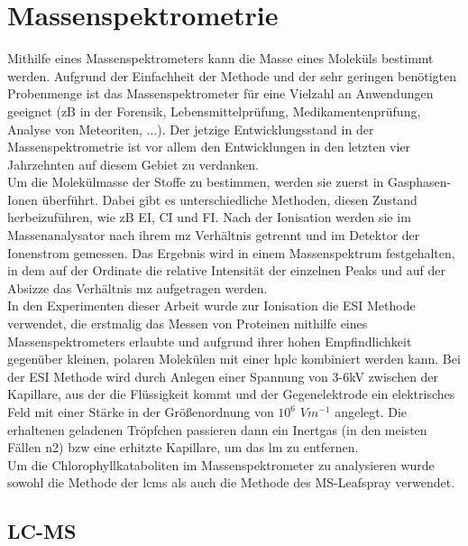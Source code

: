 \section{Massenspektrometrie}

Mithilfe eines Massenspektrometers kann die Masse eines Moleküls bestimmt werden. Aufgrund der Einfachheit der Methode und der sehr geringen benötigten Probenmenge ist das Massenspektrometer für eine Vielzahl an Anwendungen geeignet (\gls{zB} in der Forensik, Lebensmittelprüfung, Medikamentenprüfung, Analyse von Meteoriten, ...). \cite[S. 1]{MassSpectrometry} Der jetzige Entwicklungsstand in der Massenspektrometrie ist vor allem den Entwicklungen in den letzten vier Jahrzehnten auf diesem Gebiet zu verdanken. \cite[S. 6-9]{MassSpectrometry} \\

Um die Molekülmasse der Stoffe zu bestimmen, werden sie zuerst in Gasphasen-Ionen überführt. \cite[S. 15]{MassSpectrometry} Dabei gibt es unterschiedliche Methoden, diesen Zustand herbeizuführen, wie \gls{zB} \gls{EI}, \gls{CI} und \gls{FI}. \cite[S. 15-30]{MassSpectrometry} Nach der Ionisation werden sie im Massenanalysator nach ihrem \gls{mz} Verhältnis getrennt und im Detektor der Ionenstrom gemessen. Das Ergebnis wird in einem Massenspektrum festgehalten, in dem auf der Ordinate die relative Intensität der einzelnen Peaks und auf der Absizze das Verhältnis \gls{mz} aufgetragen werden. \\

In den Experimenten dieser Arbeit wurde zur Ionisation die \gls{ESI} Methode verwendet, die erstmalig das Messen von Proteinen mithilfe eines Massenspektrometers erlaubte und aufgrund ihrer hohen Empfindlichkeit gegenüber kleinen, polaren Molekülen mit einer \gls{hplc} kombiniert werden kann. Bei der \gls{ESI} Methode wird durch Anlegen einer Spannung von 3-6kV zwischen der Kapillare, aus der die Flüssigkeit kommt und der Gegenelektrode ein elektrisches Feld mit einer Stärke in der Größenordnung von $10^{6}$ $Vm^{-1}$ angelegt. Die erhaltenen geladenen Tröpfchen passieren dann ein Inertgas (in den meisten Fällen \gls{n2}) \gls{bzw} eine erhitzte Kapillare, um das \gls{lm} zu entfernen. \cite[S. 43-44]{MassSpectrometry} \\

Um die Chlorophyllkataboliten im Massenspektrometer zu analysieren wurde sowohl die Methode der \gls{lcms} als auch die Methode des MS-Leafspray verwendet. 

\subsection{LC-MS}

